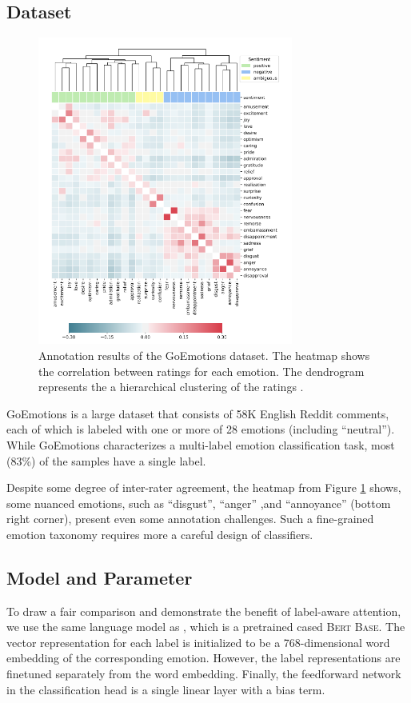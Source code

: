 \subsection{Dataset}

\begin{figure}[h]
    \centering
    \includegraphics[width=8.4cm]{img/corr.png}
    \caption{Annotation results of the GoEmotions dataset. The heatmap shows the correlation between ratings for each emotion. The dendrogram represents the a hierarchical clustering of the ratings \citet{demszky2020goemotions}.}
\label{fig:corr}
\end{figure}


GoEmotions is a large dataset that consists of 58K English Reddit comments, each of which is labeled with one or more of 28 emotions (including ``neutral''). While GoEmotions characterizes a multi-label emotion classification task, most (83\%) of the samples have a single label. 


Despite some degree of inter-rater agreement, the heatmap from  Figure \ref{fig:corr} shows, some nuanced emotions, such as ``disgust'', ``anger'' ,and ``annoyance'' (bottom right corner), present even some annotation challenges. Such a fine-grained emotion taxonomy requires more a careful design of classifiers. 


\subsection{Model and Parameter}

To draw a fair comparison and demonstrate the benefit of label-aware attention, we use the same language model as \citet{demszky2020goemotions}, which is a pretrained cased \textsc{Bert Base}. The vector representation for each label is initialized to be a 768-dimensional word embedding of the corresponding emotion. However, the label representations are finetuned separately from the word embedding. Finally, the feedforward network in the classification head is a single linear layer with a bias term. 

